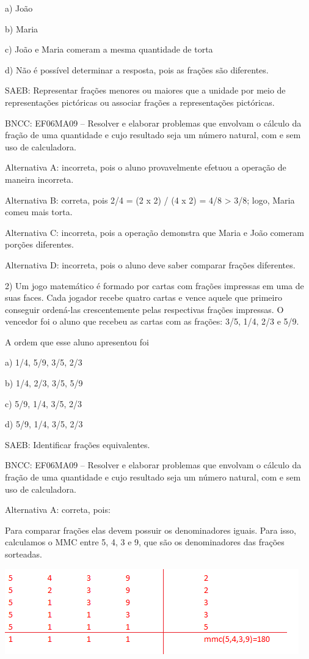 a) João

b) Maria

c) João e Maria comeram a mesma quantidade de torta

d) Não é possível determinar a resposta, pois as frações são diferentes.

SAEB: Representar frações menores ou maiores que a unidade por meio de
representações pictóricas ou associar frações a representações
pictóricas.

BNCC: EF06MA09 -- Resolver e elaborar problemas que envolvam o cálculo
da fração de uma quantidade e cujo resultado seja um número natural, com
e sem uso de calculadora.

Alternativa A: incorreta, pois o aluno provavelmente efetuou a operação
de maneira incorreta.

Alternativa B: correta, pois 2/4 = (2 x 2) / (4 x 2) = 4/8
\textgreater{} 3/8; logo, Maria comeu mais torta.

Alternativa C: incorreta, pois a operação demonstra que Maria e João
comeram porções diferentes.

Alternativa D: incorreta, pois o aluno deve saber comparar frações
diferentes.

2) Um jogo matemático é formado por cartas com frações impressas em uma
de suas faces. Cada jogador recebe quatro cartas e vence aquele que
primeiro conseguir ordená-las crescentemente pelas respectivas frações
impressas. O vencedor foi o aluno que recebeu as cartas com as frações:
3/5, 1/4, 2/3 e 5/9.

A ordem que esse aluno apresentou foi

a) 1/4, 5/9, 3/5, 2/3

b) 1/4, 2/3, 3/5, 5/9

c) 5/9, 1/4, 3/5, 2/3

d) 5/9, 1/4, 3/5, 2/3

SAEB: Identificar frações equivalentes.

BNCC: EF06MA09 -- Resolver e elaborar problemas que envolvam o cálculo
da fração de uma quantidade e cujo resultado seja um número natural, com
e sem uso de calculadora.

Alternativa A: correta, pois:

Para comparar frações elas devem possuir os denominadores iguais. Para
isso, calculamos o MMC entre 5, 4, 3 e 9, que são os denominadores das
frações sorteadas.

\includegraphics[width=5.01042in,height=1.44792in]{./imgSAEB_6_MAT/media/image36.png}


